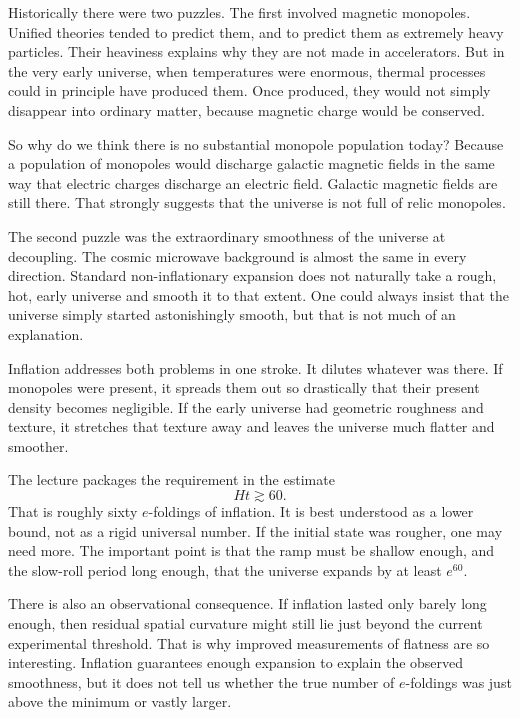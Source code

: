 Historically there were two puzzles. The first involved magnetic monopoles. Unified theories tended to predict them, and to predict them as extremely heavy particles. Their heaviness explains why they are not made in accelerators. But in the very early universe, when temperatures were enormous, thermal processes could in principle have produced them. Once produced, they would not simply disappear into ordinary matter, because magnetic charge would be conserved.

So why do we think there is no substantial monopole population today? Because a population of monopoles would discharge galactic magnetic fields in the same way that electric charges discharge an electric field. Galactic magnetic fields are still there. That strongly suggests that the universe is not full of relic monopoles.

The second puzzle was the extraordinary smoothness of the universe at decoupling. The cosmic microwave background is almost the same in every direction. Standard non-inflationary expansion does not naturally take a rough, hot, early universe and smooth it to that extent. One could always insist that the universe simply started astonishingly smooth, but that is not much of an explanation.

Inflation addresses both problems in one stroke. It dilutes whatever was there. If monopoles were present, it spreads them out so drastically that their present density becomes negligible. If the early universe had geometric roughness and texture, it stretches that texture away and leaves the universe much flatter and smoother.

The lecture packages the requirement in the estimate
\begin{equation}
Ht\gtrsim 60.
\end{equation}
That is roughly sixty \(e\)-foldings of inflation. It is best understood as a lower bound, not as a rigid universal number. If the initial state was rougher, one may need more. The important point is that the ramp must be shallow enough, and the slow-roll period long enough, that the universe expands by at least \(e^{60}\).

There is also an observational consequence. If inflation lasted only barely long enough, then residual spatial curvature might still lie just beyond the current experimental threshold. That is why improved measurements of flatness are so interesting. Inflation guarantees enough expansion to explain the observed smoothness, but it does not tell us whether the true number of \(e\)-foldings was just above the minimum or vastly larger.


